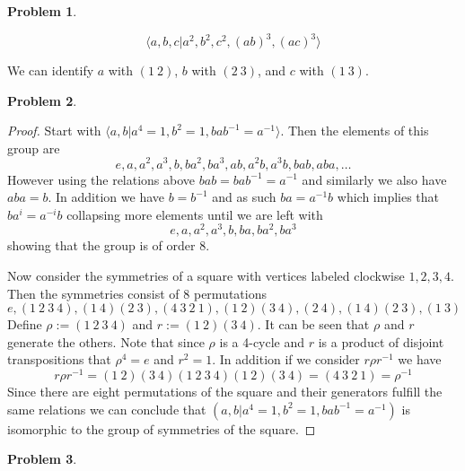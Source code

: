 \documentclass[10pt]{article}
\newcommand{\sk}{\vskip 10mm}
\theoremstyle{plain}
\newtheorem{problem}{Problem}
\theoremstyle{remark}
\begin{document}
\begin{problem} %
  
\end{problem}

\[\langle a,b,c | a^2,b^2,c^2,(ab)^3,(ac)^3 \rangle\]

We can identify $a$ with $(1\ 2)$, $b$ with $(2\ 3)$, and
$c$ with $(1\ 3)$.

\sk

\begin{problem} %
  
\end{problem}

\begin{proof}
  Start with $\langle a,b| a^4=1,b^2=1,bab^{-1}=a^{-1}\rangle$. Then the elements of this group
  are
  \[ e,a,a^2,a^3,b,ba^2,ba^3,ab,a^2b,a^3b,bab,aba,\ldots \]
  However using the relations above $bab=bab^{-1}=a^{-1}$ and similarly
  we also have $aba=b$. In addition we have $b=b^{-1}$ and as such $ba=a^{-1}b$
  which implies that $ba^i=a^{-i}b$ collapsing more elements until we are left with
  \[ e,a,a^2,a^3,b,ba,ba^2,ba^3 \]
  showing that the group is of order 8.

  Now consider the symmetries of a square with vertices labeled clockwise $1,2,3,4$.
  Then the symmetries consist of 8 permutations
  \[ e,(1\ 2\ 3\ 4),(1\ 4)(2\ 3),(4\ 3\ 2\ 1),(1\ 2)(3\ 4),(2\ 4),(1\ 4)(2\ 3),(1\ 3)\]
  Define $\rho:=(1\ 2\ 3\ 4)$ and $r:=(1\ 2)(3\ 4)$. It can be seen that $\rho$ and $r$
  generate the others. Note that since $\rho$ is a 4-cycle and
  $r$ is a product of disjoint transpositions that $\rho^4=e$ and $r^2=1$.
  In addition if we consider $r\rho r^{-1}$ we have
  \[ r\rho r^{-1}=(1\ 2)(3\ 4)(1\ 2\ 3\ 4)(1\ 2)(3\ 4)=(4\ 3\ 2\ 1)=\rho^{-1}\]
  Since there are eight permutations of the square and their generators fulfill the
  same relations we can conclude that
  $( a,b| a^4=1,b^2=1,bab^{-1}=a^{-1})$ is isomorphic to the group of symmetries of the
  square.
\end{proof}

\sk

\begin{problem} %
  
\end{problem}
\end{document}
